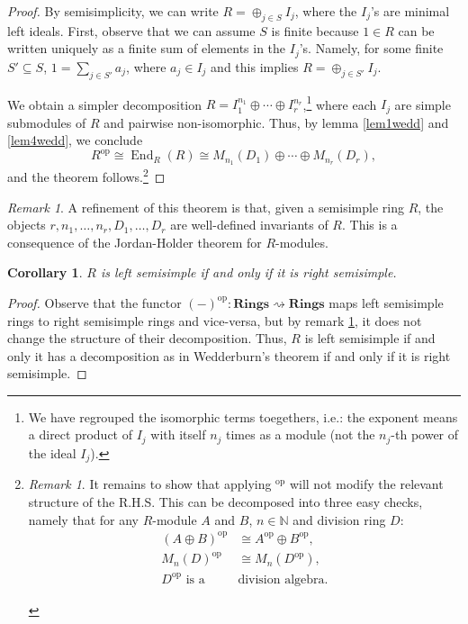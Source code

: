 \documentclass{tufte-handout} %
\newtheorem{cor}[thm]{Corollary}
\theoremstyle{definition}
\theoremstyle{remark}
\newtheorem{rem}[thm]{Remark}
\newcommand{\op}[1]{#1^{\text{op}}}
\newcommand{\N}{\mathbb{N}}
\DeclareMathOperator{\End}{End}
\begin{document}
\begin{proof}
	By semisimplicity, we can write $R = \oplus_{j \in S} I_j$, where the $I_j$'s are minimal left ideals. First, observe that we can assume $S$ is finite because $1 \in R$ can be written uniquely as a finite sum of elements in the $I_j$'s. Namely, for some finite $S' \subseteq S$, $1 = \sum_{j \in S'} a_j$, where $a_j \in I_j$ and this implies $R = \oplus_{j \in S'} I_j$.
	
	We obtain a simpler decomposition $R = I_1^{n_1} \oplus \cdots \oplus I_r^{n_r}$,\footnote{We have regrouped the isomorphic terms toegethers, i.e.: the exponent means a direct product of $I_j$ with itself $n_j$ times as a module (not the $n_j$-th power of the ideal $I_j$).} where each $I_j$ are simple submodules of $R$ and pairwise non-isomorphic. Thus, by lemma \ref{lem1wedd} and \ref{lem4wedd}, we conclude 
	\[\op{R} \cong \End_R(R) \cong M_{n_1}(D_1) \oplus \cdots \oplus M_{n_r}(D_r),\]
	and the theorem follows.\footnote{\begin{rem}\label{remopfunc}
			It remains to show that applying $\op{}$ will not modify the relevant structure of the R.H.S. This can be decomposed into three easy checks, namely that for any $R$-module $A$ and $B$, $n \in \N$ and division ring $D$:\begin{align*}
			\op{(A\oplus B)} &\cong \op{A} \oplus \op{B},\\
			\op{M_n(D)} &\cong M_n(\op{D}),\\
			\op{D} \text{ is a }&\text{division algebra.}
			\end{align*}
		\end{rem}}
\end{proof}%
\begin{rem}
	A refinement of this theorem is that, given a semisimple ring $R$, the objects $r, n_1, \dots, n_r, D_1, \dots, D_r$ are well-defined invariants of $R$. This is a consequence of the Jordan-Holder theorem for $R$-modules. %
\end{rem}
\begin{cor}\label{rightleftsimple}
	$R$ is left semisimple if and only if it is right semisimple.
\end{cor}
\begin{proof}
	Observe that the functor $\op{(-)}: \textbf{Rings} \rightsquigarrow \textbf{Rings}$ maps left semisimple rings to right semisimple rings and vice-versa, but by remark \ref{remopfunc}, it does not change the structure of their decomposition. Thus, $R$ is left semisimple if and only it has a decomposition as in Wedderburn's theorem if and only if it is right semisimple.
\end{proof}
\end{document}
